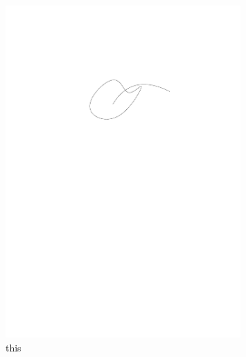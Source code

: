\documentclass{article}
\begin{document}
\begin{figure}[ht]
    \centering
 \includegraphics[width=0.8\textwidth]{./figures/this.pdf}
    \caption{this}
    \label{fig:this}
\end{figure}
\end{document}
